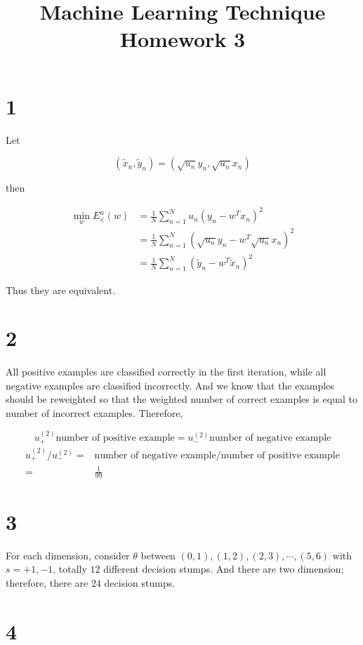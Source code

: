 \documentclass[fleqn,a4paper,12pt]{article}
\title{Machine Learning Technique Homework 3}
\date{}
\begin{document}
\maketitle
\thispagestyle{fancy}

\section*{1}

Let

$$(\tilde{x}_n, \tilde{y}_n) = (\sqrt{u_n}y_n, \sqrt{u_n}x_n)$$

then

\begin{align*}
  \min_{w} E^u_{\in}(w)
  &= \frac{1}{N} \sum_{n=1}^N u_n(y_n - w^Tx_n)^2 \\
  &= \frac{1}{N} \sum_{n=1}^N (\sqrt{u_n}y_n - w^T \sqrt{u_n} x_n)^2 \\
  &= \frac{1}{N} \sum_{n=1}^N (\tilde{y}_n - w^T \tilde{x}_n)^2
\end{align*}

Thus they are equivalent.


\section*{2}

All positive examples are classified correctly in the first iteration, while all negative examples are classified incorrectly. And we know that the examples should be reweighted so that the weighted number of correct examples is equal to number of incorrect examples. Therefore,

$$u^{(2)}_{+}  \text{number of positive example} =  u^{(2)}_{-} \text{number of negative example}$$
\begin{align*}
  u^{(2)}_{+} / u^{(2)}_{-}
  =&   \text{number of negative example} / \text{number of positive example} \\
  =& \frac{1}{99}
\end{align*}


\section*{3}

For each dimension, consider $\theta$ between $(0, 1), (1, 2), (2, 3), \cdots, (5, 6)$ with $s = {+1, -1}$, totally $12$ different decision stumps. And there are two dimension; therefore, there are $24$ decision stumps.


\section*{4}
\end{document}
